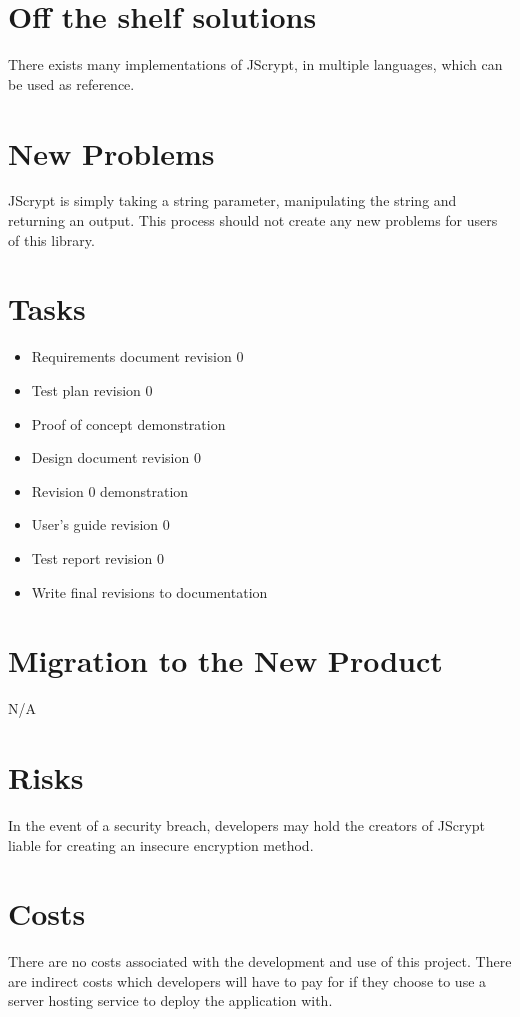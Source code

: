 \documentclass[12pt]{article}
\begin{document}
\section {Off the shelf solutions}
There exists many implementations of JScrypt, in multiple languages, which can be used as reference.

\section {New Problems}
JScrypt is simply taking a string parameter, manipulating the string and returning an output. This process should not create any new problems for users of this library.

\section {Tasks}
\begin{itemize}
  \item Requirements document revision 0
  \item Test plan revision 0
  \item Proof of concept demonstration
  \item Design document revision 0
  \item Revision 0 demonstration
  \item User's guide revision 0
  \item Test report revision 0
  \item Write final revisions to documentation
  \end{itemize}

\section {Migration to the New Product}
N/A  

\section {Risks}
In the event of a security breach, developers may hold the creators of JScrypt liable for creating an insecure encryption method.

\section {Costs}
There are no costs associated with the development and use of this project. There are indirect costs which developers will have to pay for if they choose to use a server hosting service to deploy the application with.
\end{document}
